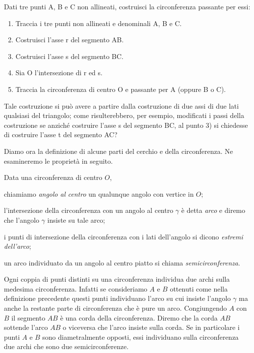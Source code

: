 \begin{procedura}
  Dati tre punti A, B e C non allineati, costruisci la circonferenza 
passante per essi:
  \begin{enumerate} [nosep]
    \item 
    Traccia i tre punti non allineati e denominali A, B e C.
    \item 
    Costruisci l'asse r del segmento AB. 
    \item 
    Costruisci l'asse s del segmento BC. 
    \item 
    Sia O l'intersezione di r ed s.
    \item 
    Traccia la circonferenza di centro O e passante per A (oppure B 
o C).
  \end{enumerate}
  Tale costruzione si può avere a partire dalla costruzione di due assi 
di due lati qualsiasi del triangolo; come risulterebbero, per esempio, 
modificati i passi della costruzione se anziché costruire l'asse s del segmento 
BC, al punto 3) si chiedesse di costruire l'asse t del segmento AC?
\end{procedura} 

Diamo ora la definizione di alcune parti del cerchio e della 
circonferenza. Ne esamineremo le proprietà in seguito.
\begin{definizione}
Data una circonferenza di centro \(O\),
\begin{itemize*}
\item chiamiamo \emph{angolo al centro} un qualunque angolo con 
vertice in \(O\);
\item l'intersezione della circonferenza con un angolo al centro 
\(\gamma\) è detta \emph{arco} e diremo che l'angolo \(\gamma\) insiste 
su tale arco;
\item i punti di intersezione della circonferenza con i lati 
dell'angolo si dicono \emph{estremi dell'arco};
\item un arco individuato da un angolo al centro piatto si chiama 
\emph{semicirconferenza}.
\end{itemize*}
\end{definizione}

\noindent\begin{minipage}{0.6\textwidth}\parindent15pt
Ogni coppia di punti distinti su una circonferenza individua due 
archi sulla medesima circonferenza. Infatti se consideriamo \(A\) e \(B\) 
ottenuti come nella definizione precedente questi punti individuano 
l'arco su cui insiste l'angolo \(\gamma\) ma anche la restante parte di 
circonferenza che è pure un arco.
Congiungendo \(A\) con \(B\) il segmento \(AB\) è una corda della 
circonferenza. Diremo che la corda \(AB\) sottende l'arco \(AB\) o 
viceversa che l'arco insiste sulla corda.
Se in particolare i punti \(A\) e \(B\) sono diametralmente opposti, essi 
individuano sulla circonferenza due archi che sono due 
semicirconferenze.
\end{minipage}\hfil
\begin{minipage}{0.4\textwidth}
  \centering
\end{minipage}

